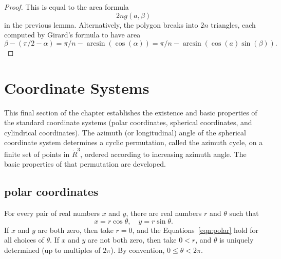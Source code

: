 \begin{proof} This is equal to the area formula
$$
2 n g(a,\beta)
$$
in the previous lemma.
Alternatively, the polygon breaks into $2n$ triangles, each computed by Girard's
formula to have area
$$
\beta - (\pi/2 - \alpha)  = \pi/n - \arcsin(\cos(\alpha)) = 
\pi/n - \arcsin(\cos(a)\sin(\beta)).
$$
\end{proof}


%
%


\section{Coordinate Systems}

This final section of the chapter establishes the existence
and basic properties of the standard coordinate systems
(polar coordinates, spherical coordinates, and cylindrical
coordinates).  The azimuth (or longitudinal) angle of the
spherical coordinate system determines a cyclic permutation,
called the azimuth cycle, on a finite set of points in $\ring{R}^3$, ordered according
to increasing azimuth angle.  The basic
properties of that permutation are developed. 
%
%
%
%
%
%

\subsection{polar coordinates}
\label{sec:polar}
%
%


For every pair of real numbers $x$ and $y$,  there are real numbers
$r$ and $\theta$ such that
    \begin{equation}\label{eqn:polar}
    x = r\cos\theta,\quad y = r\sin\theta.
    \end{equation}
If $x$ and $y$ are both zero, then take $r=0$, and the
Equations~\ref{eqn:polar} hold for all choices of $\theta$. If $x$
and $y$ are not both zero, then take $0<r$, and $\theta$ is
uniquely determined (up to multiples of $2\pi$).  By convention, 
$0\le\theta < 2\pi$.
%
%

